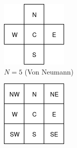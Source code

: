 \begin{figure}
\centering
\begin{subfigure}[t]{.175\columnwidth}
\centering
\includegraphics[width=\columnwidth]{fig/VonNeumann}
\caption{$N=5$ (Von Neumann)}
\label{fig:neighborhoods_vn}
\end{subfigure}\hfill%
\begin{subfigure}[t]{.175\columnwidth}
\centering
\includegraphics[width=\columnwidth]{fig/Moore}

\end{subfigure}
\end{figure}
